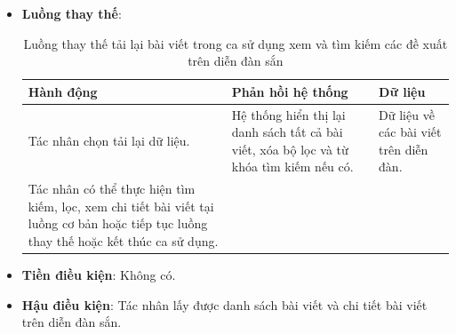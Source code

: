 \documentclass[./../main.tex]{subfiles}
\begin{document}
\begin{itemize}
    \item \textbf{Luồng thay thế}:
        \begin{table}[H]
        \caption{\label{uc-29}Luồng thay thế tải lại bài viết trong ca sử dụng xem và tìm kiếm các đề xuất trên diễn đàn sắn}
        \begin{tabularx}{\textwidth}{| X | X | X |}
            \hline
            \textbf{Hành động} & \textbf{Phản hồi hệ thống} & \textbf{Dữ liệu} \\ \hline
            Tác nhân chọn tải lại dữ liệu. & Hệ thống hiển thị lại danh sách tất cả bài viết, xóa bộ lọc và từ khóa tìm kiếm nếu có. & Dữ liệu về các bài viết trên diễn đàn. 
            \\ \hline
            Tác nhân có thể thực hiện tìm kiếm, lọc, xem chi tiết bài viết tại luồng cơ bản hoặc tiếp tục luồng thay thế hoặc kết thúc ca sử dụng. &  &
            \\ \hline
        \end{tabularx}
        \end{table}
    \item \textbf{Tiền điều kiện}: Không có.
    \item \textbf{Hậu điều kiện}: Tác nhân lấy được danh sách bài viết và chi tiết bài viết trên diễn đàn sắn.
\end{itemize}
\end{document}
